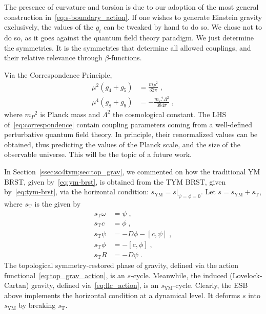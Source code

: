 \documentclass[../main.tex]{subfiles}
\begin{document}
The presence of curvature and torsion is due to our adoption of the most general construction in~\eqref{eq:s-boundary_action}. If one wishes to generate Einstein gravity exclusively, the values of the $ g_i $ can be tweaked by hand to do so. We chose not to do so, as it goes against the quantum field theory paradigm. We just determine the symmetries. It is the symmetries that determine all allowed couplings, and their relative relevance through $ \beta $-functions.

Via the Correspondence Principle,
\begin{subequations}%
  \label{eq:correspondence}
  \begin{align}
    \mu^2 \left( g_4+g_5 \right) & = \frac{{m_P}^2}{32\pi} \;,            \\
    \mu^4 \left( g_8+g_9 \right) & = -\frac{{m_P}^2\Lambda^2}{384\pi} \;,
  \end{align}
\end{subequations}
where ${m_P}^2$ is Planck mass and $\Lambda^2$ the cosmological constant. The LHS of~\eqref{eq:correspondence} contain coupling parameters coming from a well-defined perturbative quantum field theory. In principle, their renormalized values can be obtained, thus predicting the values of the Planck scale, and the size of the observable universe. This will be the topic of a future work.

In Section~\ref{ssec:so4tym;sec:top_grav}, we commented on how the traditional YM BRST, given by~\eqref{eq:ym-brst}, is obtained from the TYM BRST, given by~\eqref{eq:tym-brst}, via the horizontal condition: $ s_{\text{YM}} = s|_{\psi = \phi = 0} $. Let $ s = s_{\text{YM}} + s_{\text{T}} $, where $ s_{\text{T}} $ is the  given by
\begin{subequations}%
  \label{eq:s_T}
  \begin{align}
    s_{\text{T}} \omega & = \psi \;,                              \\
    s_{\text{T}} c      & = \phi \;,                              \\
    s_{\text{T}} \psi   & = - D \phi - \left[ c, \psi \right] \;, \\
    s_{\text{T}} \phi   & = - \left[ c, \phi \right] \;,          \\
    s_{\text{T}} R      & = - D \psi \;.
  \end{align}
\end{subequations}
The topological symmetry-restored phase of gravity, defined via the action functional~\eqref{eq:top_grav_action}, is an $s$-cycle. Meanwhile, the induced (Lovelock-Cartan) gravity, defined via~\eqref{eq:llc_action}, is an $ s_{\text{YM}} $-cycle. Clearly, the ESB above implements the horizontal condition at a dynamical level. It deforms $ s $ into $ s_{\text{YM}} $ by breaking $ s_{\text{T}} $.
\end{document}
